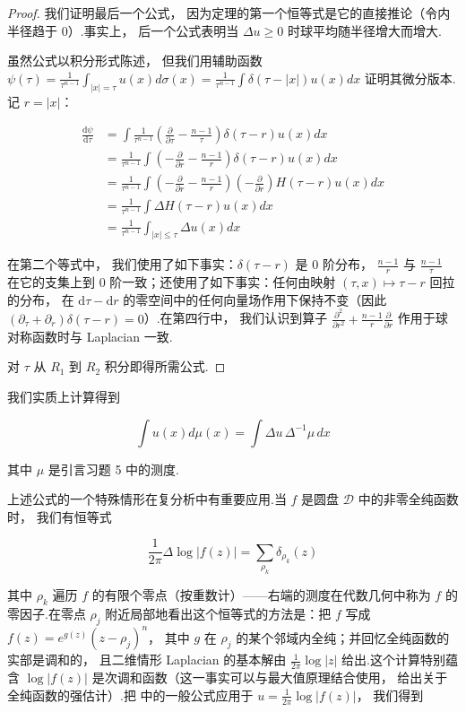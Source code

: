 \begin{proof}
我们证明最后一个公式， 因为定理的第一个恒等式是它的直接推论（令内半径趋于 0）.事实上， 后一个公式表明当 $\Delta u \geq 0$ 时球平均随半径增大而增大.

虽然公式以积分形式陈述， 但我们用辅助函数 $\psi(\tau) = \frac{1}{\tau^{n-1}}\int_{|x|=\tau}u(x)d\sigma(x) = \frac{1}{\tau^{n-1}}\int\delta(\tau-|x|)u(x)dx$ 证明其微分版本.记 $r = |x|$：

\[
\begin{aligned}
\frac{\mathrm{d}\psi}{\mathrm{d}\tau} &= \int\frac{1}{\tau^{n-1}}\left(\frac{\partial}{\partial\tau} - \frac{n-1}{\tau}\right)\delta(\tau-r)u(x)dx \\
&= \frac{1}{\tau^{n-1}}\int\left(-\frac{\partial}{\partial r} - \frac{n-1}{r}\right)\delta(\tau-r)u(x)dx \\
&= \frac{1}{\tau^{n-1}}\int\left(-\frac{\partial}{\partial r} - \frac{n-1}{r}\right)\left(-\frac{\partial}{\partial r}\right)H(\tau-r)u(x)dx \\
&= \frac{1}{\tau^{n-1}}\int\Delta H(\tau-r)u(x)dx \\
&= \frac{1}{\tau^{n-1}}\int_{|x|\leq\tau}\Delta u(x)dx
\end{aligned}
\]

在第二个等式中， 我们使用了如下事实：$\delta(\tau-r)$ 是 0 阶分布， $\frac{n-1}{r}$ 与 $\frac{n-1}{\tau}$ 在它的支集上到 0 阶一致；还使用了如下事实：任何由映射 $(\tau, x) \mapsto \tau-r$ 回拉的分布， 在 $\mathrm{d}\tau - \mathrm{d}r$ 的零空间中的任何向量场作用下保持不变（因此 $(\partial_{\tau} + \partial_{r})\delta(\tau-r) = 0$）.在第四行中， 我们认识到算子 $\frac{\partial^{2}}{\partial r^{2}} + \frac{n-1}{r}\frac{\partial}{\partial r}$ 作用于球对称函数时与 Laplacian 一致.

对 $\tau$ 从 $R_{1}$ 到 $R_{2}$ 积分即得所需公式.
\end{proof}

\begin{remark}\label{rem:c4-2.6}
我们实质上计算得到

\[
\int u(x)d\mu(x) = \int \Delta u\, \Delta^{-1}\mu\, dx
\]

其中 $\mu$ 是引言习题 5 中的测度.
\end{remark}

上述公式的一个特殊情形在复分析中有重要应用.当 $f$ 是圆盘 $\mathcal{D}$ 中的非零全纯函数时， 我们有恒等式

\[
\frac{1}{2\pi}\Delta\log|f(z)| = \sum_{\rho_{k}}\delta_{\rho_{k}}(z)
\]

其中 $\rho_{k}$ 遍历 $f$ 的有限个零点（按重数计）——右端的测度在代数几何中称为 $f$ 的零因子.在零点 $\rho_{j}$ 附近局部地看出这个恒等式的方法是：把 $f$ 写成 $f(z) = e^{g(z)}(z-\rho_{j})^{n}$， 其中 $g$ 在 $\rho_{j}$ 的某个邻域内全纯；并回忆全纯函数的实部是调和的， 且二维情形 Laplacian 的基本解由 $\frac{1}{2\pi}\log|z|$ 给出.这个计算特别蕴含 $\log|f(z)|$ 是次调和函数（这一事实可以与最大值原理结合使用， 给出关于全纯函数的强估计）.把 中的一般公式应用于 $u = \frac{1}{2\pi}\log|f(z)|$， 我们得到

